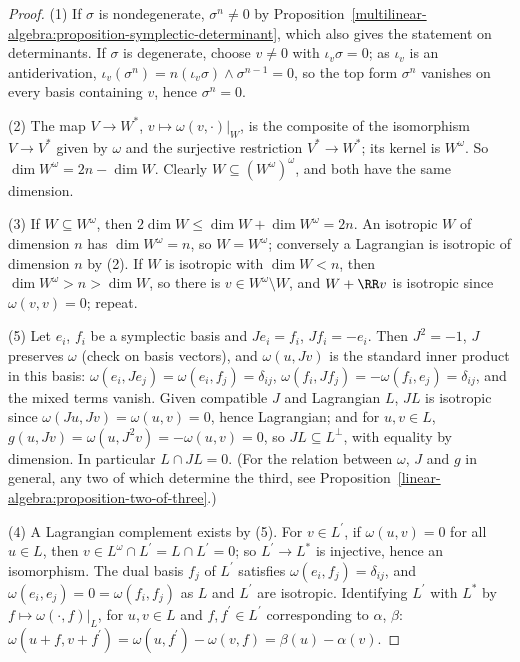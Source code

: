 \begin{proof}
(1) If $\sigma$ is nondegenerate, $\sigma^n \neq 0$ by Proposition~\ref{multilinear-algebra:proposition-symplectic-determinant}, which also gives the statement on determinants. If $\sigma$ is degenerate,
choose $v \neq 0$ with $\iota_v\sigma = 0$; as $\iota_v$ is an antiderivation, $\iota_v(\sigma^n) = n(\iota_v\sigma) \wedge \sigma^{n-1} = 0$, so the top form $\sigma^n$ vanishes on every basis containing $v$,
hence $\sigma^n = 0$.

(2) The map $V \to W^*$, $v \mapsto \omega(v, \cdot)|_W$, is the composite of the isomorphism $V \to V^*$ given by $\omega$ and the surjective restriction $V^* \to W^*$; its kernel is $W^\omega$. So
$\dim W^\omega = 2n - \dim W$. Clearly $W \subseteq (W^\omega)^\omega$, and both have the same dimension.

(3) If $W \subseteq W^\omega$, then $2\dim W \leq \dim W + \dim W^\omega = 2n$. An isotropic $W$ of dimension $n$ has $\dim W^\omega = n$, so $W = W^\omega$; conversely a Lagrangian is isotropic of dimension
$n$ by (2). If $W$ is isotropic with $\dim W < n$, then $\dim W^\omega > n > \dim W$, so there is $v \in W^\omega \setminus W$, and $W + \RR v$ is isotropic since $\omega(v, v) = 0$; repeat.

(5) Let $e_i$, $f_i$ be a symplectic basis and $Je_i = f_i$, $Jf_i = -e_i$. Then $J^2 = -1$, $J$ preserves $\omega$ (check on basis vectors), and $\omega(u, Jv)$ is the standard inner product in this basis:
$\omega(e_i, Je_j) = \omega(e_i, f_j) = \delta_{ij}$, $\omega(f_i, Jf_j) = -\omega(f_i, e_j) = \delta_{ij}$, and the mixed terms vanish. Given compatible $J$ and Lagrangian $L$, $JL$ is isotropic since
$\omega(Ju, Jv) = \omega(u, v) = 0$, hence Lagrangian; and for $u, v \in L$, $g(u, Jv) = \omega(u, J^2v) = -\omega(u, v) = 0$, so $JL \subseteq L^\perp$, with equality by dimension. In particular
$L \cap JL = 0$. (For the relation between $\omega$, $J$ and $g$ in general, any two of which determine the third, see
Proposition~\ref{linear-algebra:proposition-two-of-three}.)

(4) A Lagrangian complement exists by (5). For $v \in L^{\prime}$, if $\omega(u, v) = 0$ for all $u \in L$, then $v \in L^\omega \cap L^{\prime} = L \cap L^{\prime} = 0$; so $L^{\prime} \to L^*$ is injective, hence an isomorphism.
The dual basis $f_j$ of $L^{\prime}$ satisfies $\omega(e_i, f_j) = \delta_{ij}$, and $\omega(e_i, e_j) = 0 = \omega(f_i, f_j)$ as $L$ and $L^{\prime}$ are isotropic. Identifying $L^{\prime}$ with $L^*$ by
$f \mapsto \omega(\cdot, f)|_L$, for $u, v \in L$ and $f, f^{\prime} \in L^{\prime}$ corresponding to $\alpha$, $\beta$: $\omega(u + f, v + f^{\prime}) = \omega(u, f^{\prime}) - \omega(v, f) = \beta(u) - \alpha(v)$.
\end{proof}

